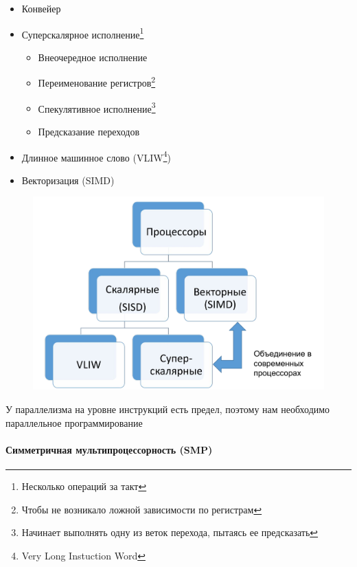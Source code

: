 \documentclass[10pt,a4paper,oneside,titlepage]{article}
\begin{document}
\begin{itemize}
	\item Конвейер
	
	\item Суперскалярное исполнение\footnote{Несколько операций за такт}
	
	\begin{itemize}
		\item Внеочередное исполнение
		
		\item Переименование регистров\footnote{Чтобы не возникало ложной зависимости по регистрам}
		
		\item Спекулятивное исполнение\footnote{Начинает выполнять одну из веток перехода, пытаясь ее предсказать}
		
		\item Предсказание переходов
	\end{itemize}

    \item Длинное машинное слово (VLIW\footnote{Very Long Instuction Word})
    
    \item Векторизация (SIMD)
\end{itemize}

\begin{figure}[h]
	\centering
	\includegraphics*[width=0.7\linewidth]{pictures/Processors}
	\caption{}
	\label{fig:processors}
\end{figure}

У параллелизма на уровне инструкций есть предел, поэтому нам необходимо параллельное программирование

\paragraph{Симметричная мультипроцессорность (SMP)}
\end{document}
